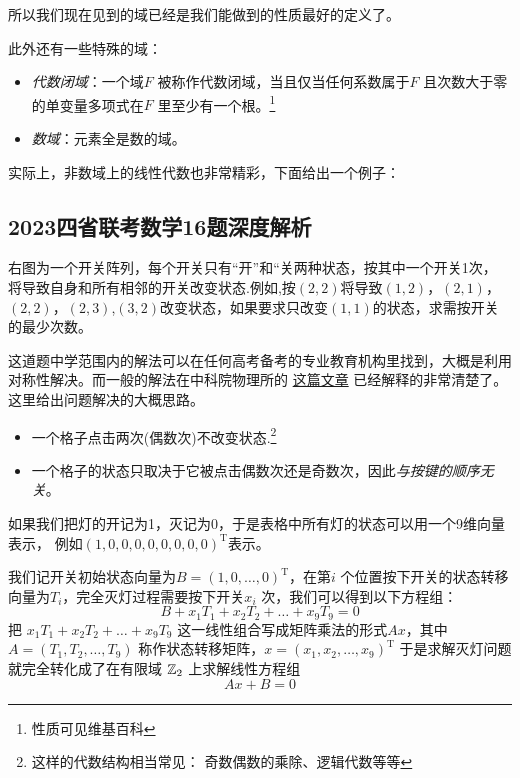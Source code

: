 所以我们现在见到的域已经是我们能做到的性质最好的定义了。

此外还有一些特殊的域：
\begin{itemize}
    \item \emph{代数闭域}：一个域\(F\) 被称作代数闭域，当且仅当任何系数属于\(F\)
        且次数大于零的单变量多项式在\(F\) 里至少有一个根。\footnote{性质可见维基百科}
    \item \emph{数域}：元素全是数的域。
\end{itemize}
实际上，非数域上的线性代数也非常精彩，下面给出一个例子：

\subsection{2023四省联考数学16题深度解析}

\begin{problem}
    右图为一个开关阵列，每个开关只有“开”和“关两种状态，按其中一个开关1次，
    将导致自身和所有相邻的开关改变状态.例如,按\((2,2)\)将导致\((1,2)\)，\((2,1)\)，
    \((2,2)\)，\((2,3)\),\((3,2)\)改变状态，如果要求只改变\((1,1)\)的状态，求需按开关的最少次数。
\end{problem}

这道题中学范围内的解法可以在任何高考备考的专业教育机构里找到，大概是利用对称性解决。而一般的解法在中科院物理所的
\href{https://mp.weixin.qq.com/s/k15Xlib2k9JOVrvBifQoiQ}{这篇文章}
已经解释的非常清楚了。这里给出问题解决的大概思路。

\begin{itemize}
    \item 一个格子点击两次(偶数次)不改变状态.\footnote{这样的代数结构相当常见： 奇数偶数的乘除、逻辑代数等等}
    \item 一个格子的状态只取决于它被点击偶数次还是奇数次，因此\emph{与按键的顺序无关}。
\end{itemize}

如果我们把灯的开记为1，灭记为0，于是表格中所有灯的状态可以用一个9维向量表示，
例如\((1,0,0,0,0,0,0,0,0)^{\mathrm{T}}\)表示。

我们记开关初始状态向量为\(B=(1,0,\dots,0)^{\mathrm{T}}\)，在第\(i\)
个位置按下开关的状态转移向量为\(T_{i}\)，完全灭灯过程需要按下开关\(x_{i}\) 次，我们可以得到以下方程组：
\[
    B+ x_{1}T_{1}+x_{2}T_{2}+\dots+x_{9}T_{9}=0
\]
把 \(x_{1}T_{1}+x_{2}T_{2}+\dots+x_{9}T_{9}\)
这一线性组合写成矩阵乘法的形式\(Ax\)，其中\(A=(T_{1}, T_{2}, \dots,
T_{9})\) 称作状态转移矩阵，\(x=(x_{1}, x_{2}, \dots, x_{9})^{\mathrm{T}}\)
于是求解灭灯问题就完全转化成了在有限域
\(\mathbb{Z}_{2}\) 上求解线性方程组\[
    Ax+B=0
\]

